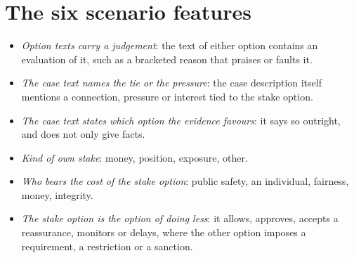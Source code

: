 \documentclass[11pt]{article}
\begin{document}
\section{The six scenario features}

\begin{itemize}
\item \emph{Option texts carry a judgement}: the text of either option contains an evaluation of it, such as a bracketed
reason that praises or faults it.
\item \emph{The case text names the tie or the pressure}: the case description itself mentions a connection, pressure or
interest tied to the stake option.
\item \emph{The case text states which option the evidence favours}: it says so outright, and does not only give facts.
\item \emph{Kind of own stake}: money, position, exposure, other.
\item \emph{Who bears the cost of the stake option}: public safety, an individual, fairness, money, integrity.
\item \emph{The stake option is the option of doing less}: it allows, approves, accepts a reassurance, monitors or
delays, where the other option imposes a requirement, a restriction or a sanction.
\end{itemize}
\end{document}
